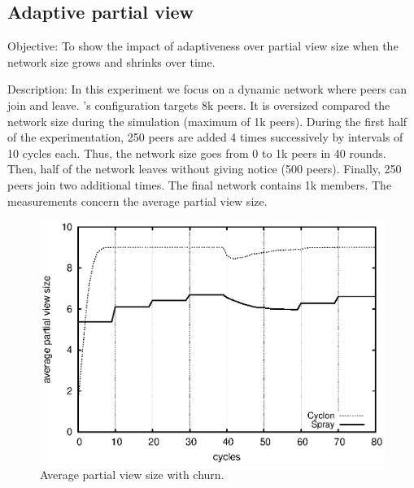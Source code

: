 \subsection{Adaptive partial view}

\begin{asparadesc}

\item[Objective:] To show the impact of adaptiveness over partial view size when
  the network size grows and shrinks over time.
\item[Description:] In this experiment we focus on a dynamic network where peers
  can join and leave.  \CYCLON's configuration targets 8k peers. It is
  oversized compared the network size during the simulation (maximum of 1k
  peers). During the first half of the experimentation, 250 peers are added 4
  times successively by intervals of 10 cycles each. Thus, the network size goes
  from 0 to 1k peers in 40 rounds. Then, half of the network leaves without
  giving notice (500 peers). Finally, 250 peers join two additional times. The
  final network contains 1k members. The measurements concern the average
  partial view size.

\begin{figure}
  \centering
  \includegraphics[width=\SCALE\textwidth]{img/avgpv.eps}
  \caption{\label{fig:churn}Average partial view size with churn.}
\end{figure}


\end{asparadesc}
